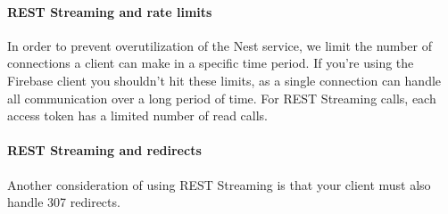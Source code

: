 \documentclass{myproc}
\begin{document}
\paragraph{REST Streaming and rate limits}
In order to prevent overutilization of the Nest service, we limit the number of connections a client can make in a specific time period. If you're using the Firebase client you shouldn't hit these limits, as a single connection can handle all communication over a long period of time. For REST Streaming calls, each access token has a limited number of read calls.

\paragraph{REST Streaming and redirects}
Another consideration of using REST Streaming is that your client must also handle 307 redirects.
\end{document}
